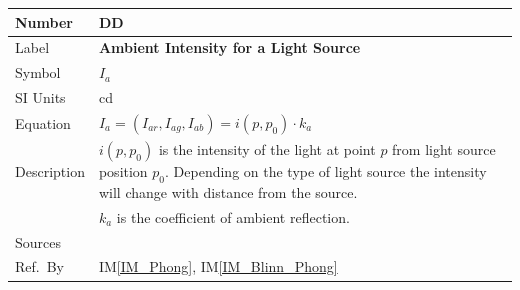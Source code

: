 \documentclass[12pt]{article}
\newcommand{\colAwidth}{0.13\textwidth}
\newcommand{\colBwidth}{0.82\textwidth}
\newcounter{defnum} %
\newcounter{datadefnum} %
\newcommand{\iref}[1]{IM\ref{#1}}
\begin{document}
\noindent
\begin{minipage}{\textwidth}
	\renewcommand*{\arraystretch}{1.5}
	\begin{tabular}{| p{\colAwidth} | p{\colBwidth}|}
		\hline
		\rowcolor[gray]{0.9}
		Number& DD{datadefnum}\thedatadefnum 
		\label{DD_Intensity_ambient}\\
		\hline
		Label& \bf Ambient Intensity for a Light Source\\
		\hline
		Symbol &$I_{a}$\\
		\hline
		SI Units & cd\\
		\hline
		Equation&$I_{a} = (I_{ar}, I_{ag}, I_{ab}) = i(p,p_{0}) \cdot k_{a}$\\
		\hline
		Description & $i(p, p_{0})$ is the intensity of the light at point $p$ 
		from light source position $p_{0}$. Depending on the type of light 
		source the intensity will change with distance from the source.\\
		& $k_{a}$ is the coefficient of ambient reflection. \\
		\hline
		Sources& \cite{shreiner2012}\\
		\hline
		Ref.\ By & \iref{IM_Phong}, \iref{IM_Blinn_Phong}\\
		\hline
	\end{tabular}
\end{minipage}\\


~\newline
\end{document}
